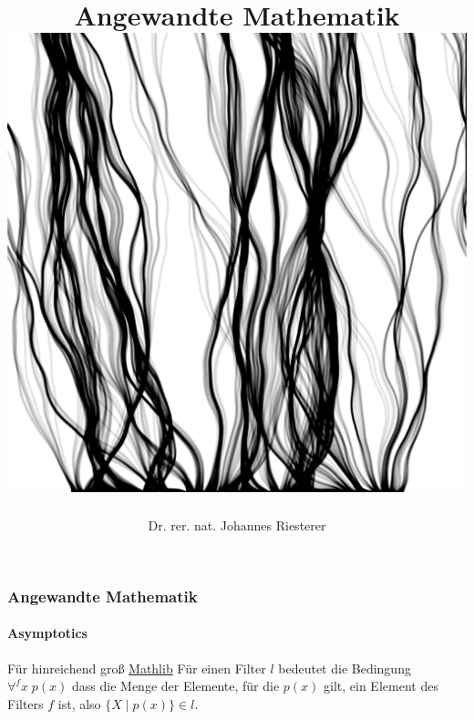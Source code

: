 \documentclass{beamer}
\begin{document}
\title[Angewandte Mathematik] %
{Angewandte Mathematik
\\
\includegraphics[scale=0.15]{images/cover}
}
\subtitle{}
\author[Dr. Johannes Riesterer] %
{Dr.  rer. nat. Johannes Riesterer}

\date[KPT 2004] %
{}

\subject{Angewandte Mathematik}

\frame{\titlepage}

\begin{frame}
    \frametitle{Angewandte Mathematik}
    \framesubtitle{Asymptotics}
    \begin{block}{Für hinreichend groß \href{https://github.com/leanprover-community/mathlib4/blob/418a5eb7aec3fb639097cb13f74fc031ac4057f2/Mathlib/Order/Filter/Defs.lean\#L243-L244}{Mathlib}}
        Für einen Filter $l$ bedeutet die Bedingung 
        \( \forall^f x \;  p(x) \) 
       dass die Menge der Elemente, für die \( p(x) \) gilt, ein Element des Filters \( f \) ist, also
        \( \{ X \; | \;  p(x) \} \in l \).
    \end{block}
\end{frame}
\end{document}
